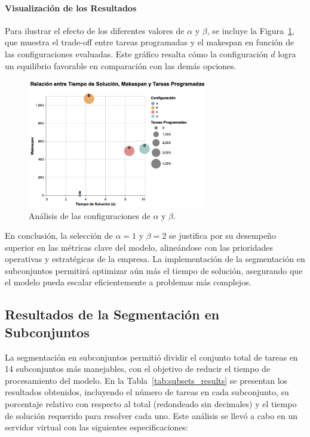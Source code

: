 \documentclass{article}
\begin{document}
\paragraph{Visualización de los Resultados}  
Para ilustrar el efecto de los diferentes valores de \( \alpha \) y \( \beta \), se incluye la Figura~\ref{fig:alpha_beta_analysis}, que muestra el trade-off entre tareas programadas y el makespan en función de las configuraciones evaluadas. Este gráfico resalta cómo la configuración \( d \) logra un equilibrio favorable en comparación con las demás opciones.

\begin{figure}[H]
    \centering
    \includegraphics[width=0.7\textwidth]{imgs/sensibilidad_soluciones.png}
    \caption{Análisis de las configuraciones de \( \alpha \) y \( \beta \).}
    \label{fig:alpha_beta_analysis}
\end{figure}

En conclusión, la selección de \( \alpha = 1 \) y \( \beta = 2 \) se justifica por su desempeño superior en las métricas clave del modelo, alineándose con las prioridades operativas y estratégicas de la empresa. La implementación de la segmentación en subconjuntos permitirá optimizar aún más el tiempo de solución, asegurando que el modelo pueda escalar eficientemente a problemas más complejos.



\subsection{Resultados de la Segmentación en Subconjuntos}

La segmentación en subconjuntos permitió dividir el conjunto total de tareas en 14 subconjuntos más manejables, con el objetivo de reducir el tiempo de procesamiento del modelo. En la Tabla~\ref{tab:subsets_results} se presentan los resultados obtenidos, incluyendo el número de tareas en cada subconjunto, su porcentaje relativo con respecto al total (redondeado sin decimales) y el tiempo de solución requerido para resolver cada uno. Este análisis se llevó a cabo en un servidor virtual con las siguientes especificaciones:  
\end{document}

